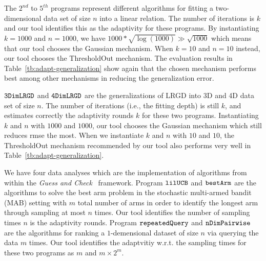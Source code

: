 The $2^{nd}$ to $5^{th}$ programs represent different algorithms for fitting a two-dimensional data set of size $n$ into a linear relation.
The number of iterations is $k$ and our tool identifies this as the  adaptivity  for these programs.
By instantiating $k = 1000$ and $n = 1000$, we have
$1000* \sqrt{\log(1000)} \gg \sqrt{1000}$ which means that our tool chooses the Gaussian mechanism. When $k=10$ and $n=10$ instead, our tool chooses the ThresholdOut mechanism. 
The evaluation results in Table~\ref{tb:adapt-generalization} show again that the chosen mechanism performs best among other mechanisms in reducing the generalization error.

$  \mathtt{ 3DimLRGD }$ and $  \mathtt{ 4DimLRGD }$ are the generalizations of LRGD into 3D and 4D data set of size $n$.
The number of iterations (i.e., the fitting depth) is still $k$, and {\THESYSTEM} estimates correctly the adaptivity rounds $k$ for these two programs.
Instantiating $k$ and $n$ with $1000$ and $1000$,
our tool chooses the Gaussian mechanism which still reduces rmse the most. When we instantiate $k$ and $n$ with $10$ and $10$, the ThresholdOut mechanism recommended by our tool also performs very well in Table~\ref{tb:adapt-generalization}. 

We have four data analyses which are the implementation of algorithms from~\cite{Jamieson2015TheAO} within the \emph{Guess and Check}~\cite{RogersRSSTW20} framework.
Program $\mathtt{lilUCB}$ and $\mathtt{bestArm}$ are the algorithms to solve the best arm problem in the stochastic multi-armed bandit (MAB) setting
with $m$ total number of arms in order to identify the longest arm through sampling at most $n$ times.
Our tool identifies the number of sampling times $n$ is the adaptivity rounds.
Program $\mathtt{repeatedQuery}$ and $\mathtt{nDimPairwise}$ are the algorithms for ranking
a $1$-demensional dataset of size $n$ via querying the data $m$ times.
Our tool identifies the adaptvitiy w.r.t. the sampling times for these two programs as $m$ and $m \times 2^m$.

